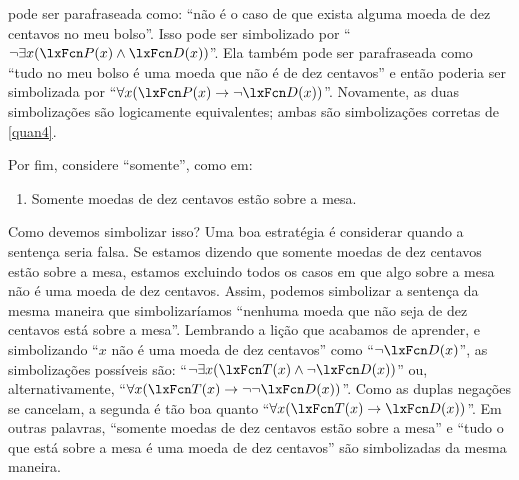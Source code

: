  pode ser parafraseada como: \textquotedblleft não é o caso de que exista alguma moeda de dez centavos no meu bolso\textquotedblright{}. Isso pode ser simbolizado por \textquotedblleft $\enot\exists x(\atom{P}{x} \eand \atom{D}{x})$\textquotedblright{}. Ela também pode ser parafraseada como \textquotedblleft tudo no meu bolso é uma moeda que não é de dez centavos\textquotedblright{} e então poderia ser simbolizada por \textquotedblleft $\forall x(\atom{P}{x} \eif \enot \atom{D}{x})$\textquotedblright{}. Novamente, as duas simbolizações são logicamente equivalentes; ambas são simbolizações corretas de \cref*{quan4}.


Por fim, considere \textquotedblleft somente\textquotedblright{}, como em:
\begin{enumerate}
	\item\label{quan5} Somente moedas de dez centavos estão sobre a mesa.
\end{enumerate}
Como devemos simbolizar isso? Uma boa estratégia é considerar quando a sentença seria falsa. Se estamos dizendo que somente moedas de dez centavos estão sobre a mesa, estamos excluindo todos os casos em que algo sobre a mesa não é uma moeda de dez centavos. Assim, podemos simbolizar a sentença da mesma maneira que simbolizaríamos \textquotedblleft nenhuma moeda que não seja de dez centavos está sobre a mesa\textquotedblright{}. Lembrando a lição que acabamos de aprender, e simbolizando \textquotedblleft $x$ não é uma moeda de dez centavos\textquotedblright{} como \textquotedblleft $\enot \atom{D}{x}$\textquotedblright{}, as simbolizações possíveis são: \textquotedblleft $\enot\exists x(\atom{T}{x} \eand \enot \atom{D}{x})$\textquotedblright{} ou, alternativamente, \textquotedblleft $\forall x(\atom{T}{x} \eif \enot\enot \atom{D}{x})$\textquotedblright{}. Como as duplas negações se cancelam, a segunda é tão boa quanto \textquotedblleft $\forall x(\atom{T}{x} \eif \atom{D}{x})$\textquotedblright{}. Em outras palavras, \textquotedblleft somente moedas de dez centavos estão sobre a mesa\textquotedblright{} e \textquotedblleft tudo o que está sobre a mesa é uma moeda de dez centavos\textquotedblright{} são simbolizadas da mesma maneira.


